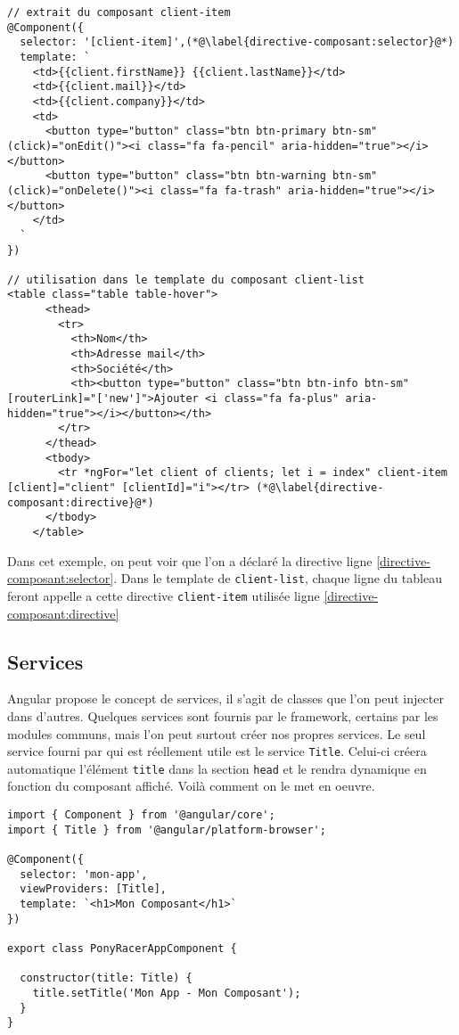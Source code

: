 \begin{lstlisting}[style=htmlcssjs, caption={Directive de composant}, label=directive-composant]
// extrait du composant client-item
@Component({
  selector: '[client-item]',(*@\label{directive-composant:selector}@*)
  template: `
    <td>{{client.firstName}} {{client.lastName}}</td>
    <td>{{client.mail}}</td>
    <td>{{client.company}}</td>
    <td>
      <button type="button" class="btn btn-primary btn-sm" (click)="onEdit()"><i class="fa fa-pencil" aria-hidden="true"></i></button>
      <button type="button" class="btn btn-warning btn-sm" (click)="onDelete()"><i class="fa fa-trash" aria-hidden="true"></i></button>
    </td>
  `
})

// utilisation dans le template du composant client-list
<table class="table table-hover">
      <thead>
        <tr>
          <th>Nom</th>
          <th>Adresse mail</th>
          <th>Société</th>
          <th><button type="button" class="btn btn-info btn-sm" [routerLink]="['new']">Ajouter <i class="fa fa-plus" aria-hidden="true"></i></button></th>
        </tr>
      </thead>
      <tbody>
        <tr *ngFor="let client of clients; let i = index" client-item  [client]="client" [clientId]="i"></tr> (*@\label{directive-composant:directive}@*)
      </tbody>
    </table>

\end{lstlisting}

Dans cet exemple, on peut voir que l'on a déclaré la directive ligne \ref{directive-composant:selector}. Dans le template de \texttt{client-list}, chaque ligne du tableau feront appelle a cette directive \texttt{client-item} utilisée ligne \ref{directive-composant:directive}

\subsection{Services}
Angular propose le concept de services, il s'agit de classes que l'on peut injecter dans d'autres.
Quelques services sont fournis par le framework, certains par les modules communs, mais l'on peut surtout créer nos propres services. Le seul service fourni par qui est réellement utile est le service \texttt{Title}. Celui-ci créera automatique l'élément \texttt{title} dans la section \texttt{head} et le rendra dynamique en fonction du composant affiché. Voilà comment on le met en oeuvre.

\begin{lstlisting}[style=htmlcssjs, caption={Service Title}, label=title]
import { Component } from '@angular/core';
import { Title } from '@angular/platform-browser';

@Component({
  selector: 'mon-app',
  viewProviders: [Title],
  template: `<h1>Mon Composant</h1>`
})

export class PonyRacerAppComponent {

  constructor(title: Title) {
    title.setTitle('Mon App - Mon Composant');
  }
}
\end{lstlisting}

